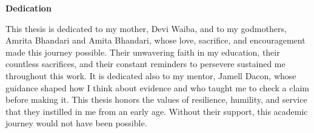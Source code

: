 \begin{frontmatterpage}
  \doublespacing
  {\centering\normalsize\bfseries Dedication\par}\vspace{\baselineskip}
  This thesis is dedicated to my mother, Devi Waiba, and to my godmothers,
  Amrita Bhandari and Amita Bhandari, whose love, sacrifice, and encouragement
  made this journey possible. Their unwavering faith in my education, their
  countless sacrifices, and their constant reminders to persevere sustained me
  throughout this work. It is dedicated also to my mentor, Jamell Dacon,
  whose guidance shaped how I think about evidence and who taught me to check a
  claim before making it. This thesis honors the values of resilience,
  humility, and service that they instilled in me from an early age. Without
  their support, this academic journey would not have been possible.
\end{frontmatterpage}
